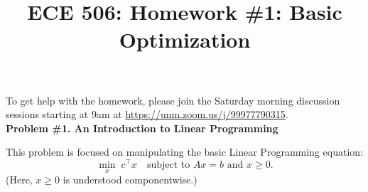 \documentclass[11pt]{article}
\title{\textbf{ECE 506: Homework \#1: Basic Optimization}}
\date{}
\begin{document}
	
	\maketitle
	
	\noindent
	To get help with the homework, please join the Saturday morning discussion sessions starting at 9am at
	\url{https://unm.zoom.us/j/99977790315}.\\
	
	\textbf{Problem \#1. An Introduction to Linear Programming}
	
	This problem is focused on manipulating the basic Linear Programming equation:
	\begin{equation}
		\min_{x}\; c^{\top}x
		\quad \text{subject to } Ax = b \text{ and } x \ge 0.
		\label{eq:lp}
	\end{equation}
	(Here, $x \ge 0$ is understood componentwise.)
	
\end{document}
